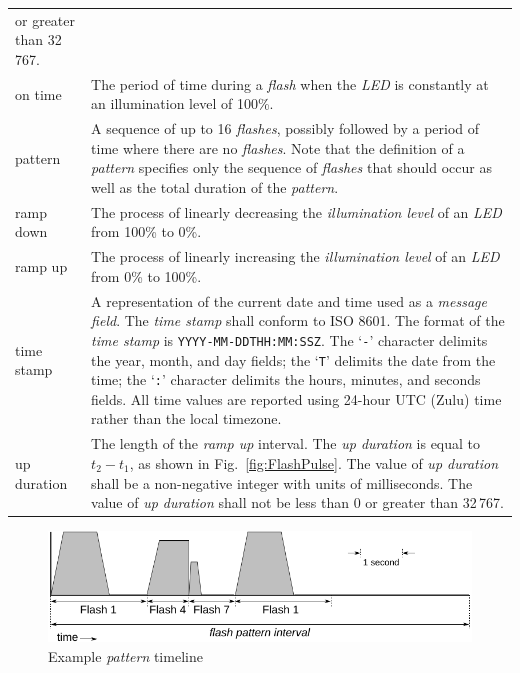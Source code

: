 \documentclass[letterpaper,11pt]{article}
\begin{document}
\begin{supertabular}{p{1.25in}p{5.25in}}
    or greater than 32\,767.\\
on time &
    The period of time during a \textit{flash} when the \textit{LED} is
    constantly at an illumination level of 100\%.\\
pattern &
    A sequence of up to 16 \textit{flashes}, possibly followed by a period
    of time where there are no \textit{flashes}.
    Note that the definition of a \textit{pattern} specifies only the sequence
    of \textit{flashes} that should occur as well as the total duration of the
    \textit{pattern}.\\
ramp down &
    The process of linearly decreasing the \textit{illumination level} of an
    \textit{LED} from 100\% to 0\%.\\
ramp up &
    The process of linearly increasing the \textit{illumination level} of an
    \textit{LED} from 0\% to 100\%.\\
time stamp &
    A representation of the current date and time used as a \textit{message
    field}. The \textit{time stamp} shall conform to ISO 8601. The format of
    the \textit{time stamp} is \texttt{YYYY-MM-DDTHH:MM:SSZ}. The `\texttt{-}'
    character delimits the year, month, and day fields; the `\texttt{T}'
    delimits the date from the time; the `\texttt{:}' character delimits the
    hours, minutes, and seconds fields. All time values are reported using
    24-hour UTC (Zulu) time rather than the local timezone.\\
up duration &
    The length of the \textit{ramp up} interval. The \textit{up duration}
    is equal to $t_2 - t_1$, as shown in Fig.\ \ref{fig:FlashPulse}. The
    value of \textit{up duration} shall be a non-negative integer with units
    of milliseconds. The value of \textit{up duration} shall not be less than
    0 or greater than 32\,767.\\
\end{supertabular}

\begin{figure}[t]
  \begin{center}
    \includegraphics[scale=1.2]{Flashes_PatternTimeline2}
  \end{center}
  \vspace{-18pt}
  \caption{Example \textit{pattern} timeline}
  \label{fig:PatternTimeline}
\end{figure}
\end{document}
